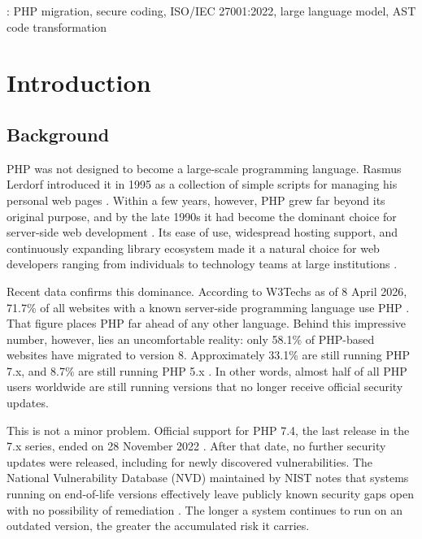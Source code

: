 : PHP migration, secure coding, ISO/IEC 27001:2022, large language model, AST code transformation



\chapter{Introduction}

\section{Background}

PHP was not designed to become a large-scale programming language. Rasmus Lerdorf introduced it in 1995 as a collection of simple scripts for managing his personal web pages \cite{phpgroup_history}. Within a few years, however, PHP grew far beyond its original purpose, and by the late 1990s it had become the dominant choice for server-side web development \cite{phpgroup_history}. Its ease of use, widespread hosting support, and continuously expanding library ecosystem made it a natural choice for web developers ranging from individuals to technology teams at large institutions \cite{phpgroup_history}.

Recent data confirms this dominance. According to W3Techs as of 8 April 2026, 71.7\% of all websites with a known server-side programming language use PHP \cite{w3techs2024php}. That figure places PHP far ahead of any other language. Behind this impressive number, however, lies an uncomfortable reality: only 58.1\% of PHP-based websites have migrated to version 8. Approximately 33.1\% are still running PHP 7.x, and 8.7\% are still running PHP 5.x \cite{w3techs2024php}. In other words, almost half of all PHP users worldwide are still running versions that no longer receive official security updates.

This is not a minor problem. Official support for PHP 7.4, the last release in the 7.x series, ended on 28 November 2022 \cite{phpgroup2022supported}. After that date, no further security updates were released, including for newly discovered vulnerabilities. The National Vulnerability Database (NVD) maintained by NIST notes that systems running on end-of-life versions effectively leave publicly known security gaps open with no possibility of remediation \cite{nist_nvd}. The longer a system continues to run on an outdated version, the greater the accumulated risk it carries.

